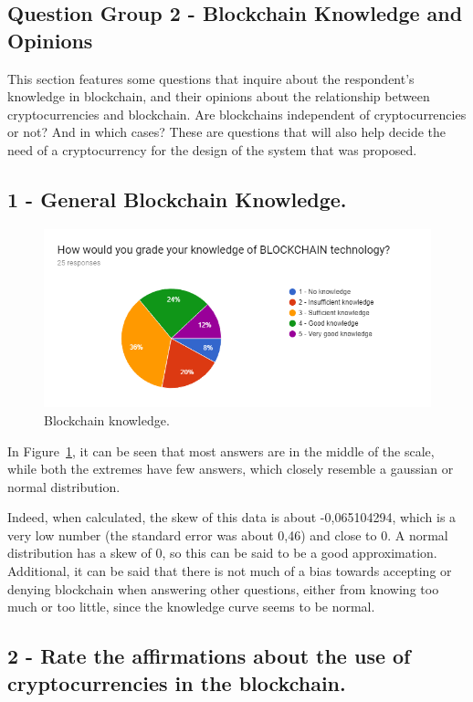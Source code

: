 
\subsection{Question Group 2 - Blockchain Knowledge and Opinions}

This section features some questions that inquire about the respondent's knowledge in blockchain, and their opinions about the relationship between cryptocurrencies and blockchain. Are blockchains independent of cryptocurrencies or not? And in which cases? These are questions that will also help decide the need of a cryptocurrency for the design of the system that was proposed.

\subsection*{1 - General Blockchain Knowledge.}
 \begin{figure}[h]
\centering
\includegraphics[scale=0.65]{media/blockchain_knowledge.png}
\caption["Blockchain knowledge."]{Blockchain knowledge.}
\label{fig:blockchain_knowledge}
\end{figure}

In Figure~\ref{fig:blockchain_knowledge}, it can be seen that most answers are in the middle of the scale, while both the extremes have few answers, which closely resemble a gaussian or normal distribution. 

Indeed, when calculated, the skew of this data is about -0,065104294, which is a very low number (the standard error was about 0,46) and close to 0. A normal distribution has a skew of 0, so this can be said to be a good approximation. Additional, it can be said that there is not much of a bias towards accepting or denying blockchain when answering other questions, either from knowing too much or too little, since the knowledge curve seems to be normal.
 
\subsection*{2 - Rate the affirmations about the use of cryptocurrencies in the blockchain.}

